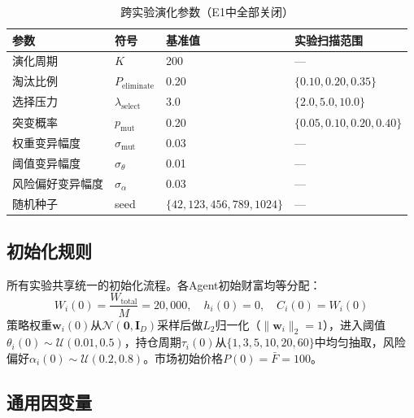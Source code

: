 \begin{table}[htb]
\centering
\caption{跨实验演化参数（E1中全部关闭）}
\label{tab:evol_params}
\begin{tabular}{@{}llll@{}}
\toprule
参数 & 符号 & 基准值 & 实验扫描范围 \\
\midrule
演化周期 & $K$ & 200 & — \\
淘汰比例 & $P_{\text{eliminate}}$ & 0.20 & $\{0.10, 0.20, 0.35\}$ \\
选择压力 & $\lambda_{\text{select}}$ & 3.0 & $\{2.0, 5.0, 10.0\}$ \\
突变概率 & $p_{\text{mut}}$ & 0.20 & $\{0.05, 0.10, 0.20, 0.40\}$ \\
权重变异幅度 & $\sigma_{\text{mut}}$ & 0.03 & — \\
阈值变异幅度 & $\sigma_\theta$ & 0.01 & — \\
风险偏好变异幅度 & $\sigma_\alpha$ & 0.03 & — \\
随机种子 & seed & $\{42, 123, 456, 789, 1024\}$ & — \\
\bottomrule
\end{tabular}
\end{table}

\subsection{初始化规则}

所有实验共享统一的初始化流程。各Agent初始财富均等分配：
\begin{equation}
W_i(0) = \frac{W_{\text{total}}}{M} = 20{,}000,\quad h_i(0)=0,\quad C_i(0)=W_i(0)
\end{equation}
策略权重$\mathbf{w}_i(0)$从$\mathcal{N}(\mathbf{0}, \mathbf{I}_D)$采样后做$L_2$归一化（$\|\mathbf{w}_i\|_2=1$），进入阈值$\theta_i(0)\sim\mathcal{U}(0.01, 0.5)$，持仓周期$\tau_i(0)$从$\{1,3,5,10,20,60\}$中均匀抽取，风险偏好$\alpha_i(0)\sim\mathcal{U}(0.2, 0.8)$。市场初始价格$P(0)=\bar{F}=100$。

\subsection{通用因变量}

